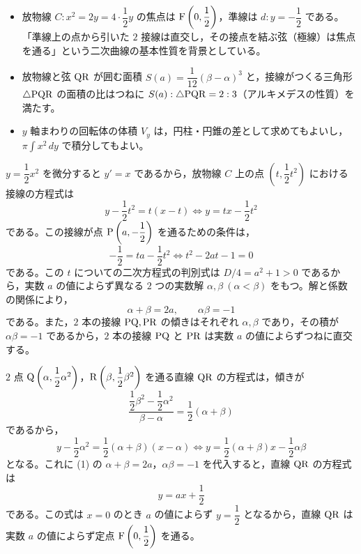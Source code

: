 
\begin{itemize}[leftmargin=1.6em,itemsep=2pt,topsep=2pt]
  \item[(1)(2)] 放物線 $C: x^{2}=2y=4\cdot\dfrac{1}{2}y$ の焦点は $\mathrm{F}\left(0, \dfrac{1}{2}\right)$，準線は $d: y=-\dfrac{1}{2}$ である。「準線上の点から引いた $2$ 接線は直交し，その接点を結ぶ弦（極線）は焦点を通る」という二次曲線の基本性質を背景としている。
  \item[(3)] 放物線と弦 $\mathrm{QR}$ が囲む面積 $S(a)=\dfrac{1}{12}(\beta-\alpha)^{3}$ と，接線がつくる三角形 $\triangle\mathrm{PQR}$ の面積の比はつねに $S(a):\triangle\mathrm{PQR}=2:3$（アルキメデスの性質）を満たす。
  \item[(4)] $y$ 軸まわりの回転体の体積 $V_{y}$ は，円柱・円錐の差として求めてもよいし，$\pi\int x^{2}\,dy$ で積分してもよい。
\end{itemize}

$y=\dfrac{1}{2}x^{2}$ を微分すると $y'=x$ であるから，放物線 $C$ 上の点 $\left(t, \dfrac{1}{2}t^{2}\right)$ における接線の方程式は
\[
  y - \frac{1}{2}t^{2} = t(x-t) \iff y = tx - \frac{1}{2}t^{2}
\]
である。この接線が点 $\mathrm{P}\left(a, -\dfrac{1}{2}\right)$ を通るための条件は，
\[
  -\frac{1}{2} = ta - \frac{1}{2}t^{2} \iff t^{2} - 2at - 1 = 0
\]
である。この $t$ についての二次方程式の判別式は $D/4=a^{2}+1>0$ であるから，実数 $a$ の値によらず異なる $2$ つの実数解 $\alpha, \beta\ (\alpha<\beta)$ をもつ。解と係数の関係により，
\[
  \alpha + \beta = 2a,\qquad \alpha\beta = -1
\]
である。また，$2$ 本の接線 $\mathrm{PQ}, \mathrm{PR}$ の傾きはそれぞれ $\alpha, \beta$ であり，その積が $\alpha\beta=-1$ であるから，$2$ 本の接線 $\mathrm{PQ}$ と $\mathrm{PR}$ は実数 $a$ の値によらずつねに直交する。


$2$ 点 $\mathrm{Q}\left(\alpha, \dfrac{1}{2}\alpha^{2}\right)$，$\mathrm{R}\left(\beta, \dfrac{1}{2}\beta^{2}\right)$ を通る直線 $\mathrm{QR}$ の方程式は，傾きが
\[
  \frac{\dfrac{1}{2}\beta^{2}-\dfrac{1}{2}\alpha^{2}}{\beta-\alpha} = \frac{1}{2}(\alpha+\beta)
\]
であるから，
\[
  y - \frac{1}{2}\alpha^{2} = \frac{1}{2}(\alpha+\beta)(x-\alpha)
  \iff y = \frac{1}{2}(\alpha+\beta)x - \frac{1}{2}\alpha\beta
\]
となる。これに (1) の $\alpha+\beta=2a$，$\alpha\beta=-1$ を代入すると，直線 $\mathrm{QR}$ の方程式は
\[
  y = ax + \frac{1}{2}
\]
である。この式は $x=0$ のとき $a$ の値によらず $y=\dfrac{1}{2}$ となるから，直線 $\mathrm{QR}$ は実数 $a$ の値によらず定点 $\mathrm{F}\left(0, \dfrac{1}{2}\right)$ を通る。

